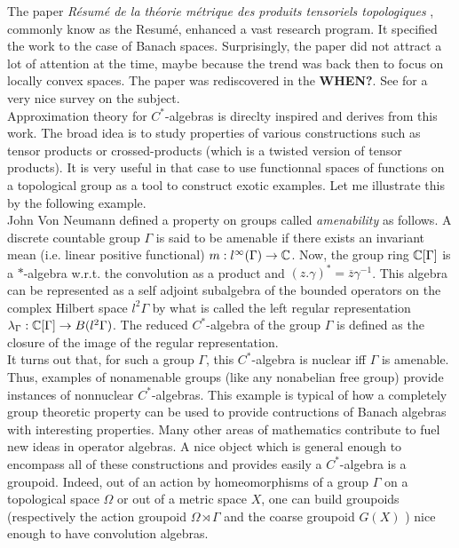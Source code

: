 The paper \textit{R\'esum\'e de la th\'eorie m\'etrique des produits tensoriels topologiques} \cite{GrothendieckResume}, commonly know as the Resum\'e, enhanced a vast research program. It specified the work to the case of Banach spaces. Surprisingly, the paper did not attract a lot of attention at the time, maybe because the trend was back then to focus on locally convex spaces. The paper was rediscovered in the \textbf{WHEN?}. See \cite{PisierSurvey} for a very nice survey on the subject.\\

Approximation theory for $C^*$-algebras is direclty inspired and derives from this work. The broad idea is to study properties of various constructions such as tensor products or crossed-products (which is a twisted version of tensor products). It is very useful in that case to use functionnal spaces of functions on a topological group as a tool to construct exotic examples. Let me illustrate this by the following example.\\

John Von Neumann defined a property on groups called \textit{amenability} as follows. A discrete countable group $\Gamma$ is said to be amenable if there exists an invariant mean (i.e. linear positive functional) $m: l^\infty(\Gamma)\rightarrow \mathbb{C}$. Now, the group ring $\mathbb{C}[\Gamma]$ is a $*$-algebra w.r.t. the convolution as a product and $(z. \gamma)^* = \overline{z}\gamma^{-1}$. This algebra can be represented as a self adjoint subalgebra of the bounded operators on the complex Hilbert space $l^2\Gamma$ by what is called the left regular representation $\lambda_\Gamma: \mathbb{C}[\Gamma]\rightarrow B(l^2\Gamma)$. The reduced $C^*$-algebra of the group $\Gamma$ is defined as the closure of the image of the regular representation.\\

It turns out that, for such a group $\Gamma$, this $C^*$-algebra is nuclear iff $\Gamma$ is amenable. Thus, examples of nonamenable groups (like any nonabelian free group) provide instances of nonnuclear $C^*$-algebras. This example is typical of how a completely group theoretic property can be used to provide contructions of Banach algebras with interesting properties. Many other areas of mathematics contribute to fuel new ideas in operator algebras. A nice object which is general enough to encompass all of these constructions and provides easily a $C^*$-algebra is a groupoid. Indeed, out of an action by homeomorphisms of a group $\Gamma$ on a topological space $\Omega$ or out of a metric space $X$, one can build groupoids (respectively the action groupoid $\Omega \rtimes \Gamma$ and the coarse groupoid $G(X)$ \cite{SkTuYu}) nice enough to have convolution algebras. \\  

